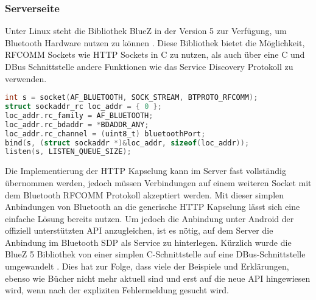         \subsubsection{Serverseite}
        
        Unter Linux steht die Bibliothek BlueZ in der Version 5 zur Verfügung, um Bluetooth Hardware nutzen zu können \cite{bluezMigration}. Diese Bibliothek bietet die Möglichkeit, RFCOMM Sockets wie HTTP Sockets in C zu nutzen, als auch über eine C und DBus Schnittstelle andere Funktionen wie das Service Discovery Protokoll zu verwenden.
        
        \begin{lstlisting}[frame=bt, label={lst:bluetooth:socket}, language=C, caption=Verbindungsaufbau mit Bluetooth (Servercode in C)]
int s = socket(AF_BLUETOOTH, SOCK_STREAM, BTPROTO_RFCOMM);
struct sockaddr_rc loc_addr = { 0 };
loc_addr.rc_family = AF_BLUETOOTH;
loc_addr.rc_bdaddr = *BDADDR_ANY;
loc_addr.rc_channel = (uint8_t) bluetoothPort;
bind(s, (struct sockaddr *)&loc_addr, sizeof(loc_addr));
listen(s, LISTEN_QUEUE_SIZE);
        \end{lstlisting}
        Die Implementierung der HTTP Kapselung kann im Server fast vollständig übernommen werden, jedoch müssen Verbindungen auf einem weiteren Socket mit dem Bluetooth RFCOMM Protokoll akzeptiert werden. Mit dieser simplen Anbindungen von Bluetooth an die generische HTTP Kapselung lässt sich eine einfache Lösung bereits nutzen. Um jedoch die Anbindung unter Android der offiziell unterstützten API anzugleichen, ist es nötig, auf dem Server die Anbindung im Bluetooth SDP als Service zu hinterlegen. Kürzlich wurde die BlueZ 5 Bibliothek von einer simplen C-Schnittstelle auf eine DBus-Schnittstelle umgewandelt \cite{BluezMigration}. Dies hat zur Folge, dass viele der Beispiele und Erklärungen, ebenso wie Bücher nicht mehr aktuell sind und erst auf die neue API hingewiesen wird, wenn nach der expliziten Fehlermeldung gesucht wird.
        
